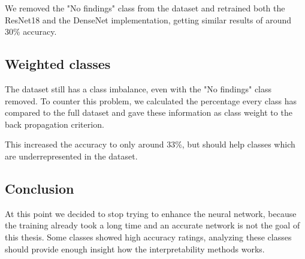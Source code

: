 We removed the "No findings" class from the dataset and retrained both the ResNet18 and the DenseNet implementation, getting similar results of around 30\% accuracy.

\subsection{Weighted classes}
The dataset still has a class imbalance, even with the "No findings" class removed. To counter this problem, we calculated the percentage every class has compared to the full dataset and gave these information as class weight to the back propagation criterion.

This increased the accuracy to only around 33\%, but should help classes which are underrepresented in the dataset.

\subsection{Conclusion}
At this point we decided to stop trying to enhance the neural network, because the training already took a long time and an accurate network is not the goal of this thesis. Some classes showed high accuracy ratings, analyzing these classes should provide enough insight how the interpretability methods works.
